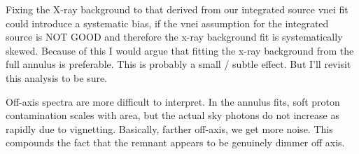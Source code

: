 \documentclass[preprint2,tighten,trackchanges]{aastex6}
\newcommand*{\abt}{\mathord{\sim}} %
\begin{document}
Fixing the X-ray background to that derived from our integrated source vnei fit
could introduce a systematic bias, if the vnei assumption for the integrated
source is NOT GOOD and therefore the x-ray background fit is systematically
skewed.
Because of this I would argue that fitting the x-ray background from the full
annulus is preferable.
This is probably a small / subtle effect.
But I'll revisit this analysis to be sure.

Off-axis spectra are more difficult to interpret.
In the annulus fits, soft proton contamination scales with area,
but the actual sky photons do not increase as rapidly due to vignetting.
Basically, farther off-axis, we get more noise.
This compounds the fact that the remnant appears to be genuinely dimmer off
axis.

\end{document}
